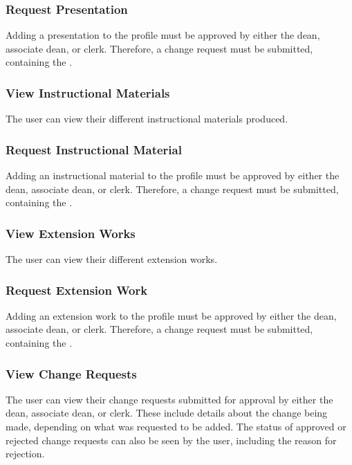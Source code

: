         \subsubsection{Request Presentation}
        Adding a presentation to the profile must be approved by either the dean, associate dean, or clerk. Therefore, a change request must be submitted, containing the .
        
        \subsubsection{View Instructional Materials}
        The user can view their different instructional materials produced.
        
        \subsubsection{Request Instructional Material}
        Adding an instructional material to the profile must be approved by either the dean, associate dean, or clerk. Therefore, a change request must be submitted, containing the .
        
        \subsubsection{View Extension Works}
        The user can view their different extension works.
        
        \subsubsection{Request Extension Work}
        Adding an extension work to the profile must be approved by either the dean, associate dean, or clerk. Therefore, a change request must be submitted, containing the .
        
        \subsubsection{View Change Requests}
        The user can view their change requests submitted for approval by either the dean, associate dean, or clerk. These include details about the change being made, depending on what was requested to be added. The status of approved or rejected change requests can also be seen by the user, including the reason for rejection.
        

